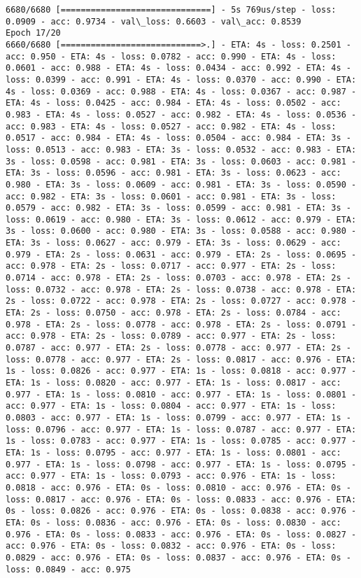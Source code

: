 \documentclass[11pt]{article}
\begin{document}
\begin{Verbatim}[commandchars=\\\{\}]
6680/6680 [==============================] - 5s 769us/step - loss: 0.0909 - acc: 0.9734 - val\_loss: 0.6603 - val\_acc: 0.8539
Epoch 17/20
6660/6680 [============================>.] - ETA: 4s - loss: 0.2501 - acc: 0.950 - ETA: 4s - loss: 0.0782 - acc: 0.990 - ETA: 4s - loss: 0.0601 - acc: 0.988 - ETA: 4s - loss: 0.0434 - acc: 0.992 - ETA: 4s - loss: 0.0399 - acc: 0.991 - ETA: 4s - loss: 0.0370 - acc: 0.990 - ETA: 4s - loss: 0.0369 - acc: 0.988 - ETA: 4s - loss: 0.0367 - acc: 0.987 - ETA: 4s - loss: 0.0425 - acc: 0.984 - ETA: 4s - loss: 0.0502 - acc: 0.983 - ETA: 4s - loss: 0.0527 - acc: 0.982 - ETA: 4s - loss: 0.0536 - acc: 0.983 - ETA: 4s - loss: 0.0527 - acc: 0.982 - ETA: 4s - loss: 0.0517 - acc: 0.984 - ETA: 4s - loss: 0.0504 - acc: 0.984 - ETA: 3s - loss: 0.0513 - acc: 0.983 - ETA: 3s - loss: 0.0532 - acc: 0.983 - ETA: 3s - loss: 0.0598 - acc: 0.981 - ETA: 3s - loss: 0.0603 - acc: 0.981 - ETA: 3s - loss: 0.0596 - acc: 0.981 - ETA: 3s - loss: 0.0623 - acc: 0.980 - ETA: 3s - loss: 0.0609 - acc: 0.981 - ETA: 3s - loss: 0.0590 - acc: 0.982 - ETA: 3s - loss: 0.0601 - acc: 0.981 - ETA: 3s - loss: 0.0579 - acc: 0.982 - ETA: 3s - loss: 0.0599 - acc: 0.981 - ETA: 3s - loss: 0.0619 - acc: 0.980 - ETA: 3s - loss: 0.0612 - acc: 0.979 - ETA: 3s - loss: 0.0600 - acc: 0.980 - ETA: 3s - loss: 0.0588 - acc: 0.980 - ETA: 3s - loss: 0.0627 - acc: 0.979 - ETA: 3s - loss: 0.0629 - acc: 0.979 - ETA: 2s - loss: 0.0631 - acc: 0.979 - ETA: 2s - loss: 0.0695 - acc: 0.978 - ETA: 2s - loss: 0.0717 - acc: 0.977 - ETA: 2s - loss: 0.0714 - acc: 0.978 - ETA: 2s - loss: 0.0703 - acc: 0.978 - ETA: 2s - loss: 0.0732 - acc: 0.978 - ETA: 2s - loss: 0.0738 - acc: 0.978 - ETA: 2s - loss: 0.0722 - acc: 0.978 - ETA: 2s - loss: 0.0727 - acc: 0.978 - ETA: 2s - loss: 0.0750 - acc: 0.978 - ETA: 2s - loss: 0.0784 - acc: 0.978 - ETA: 2s - loss: 0.0778 - acc: 0.978 - ETA: 2s - loss: 0.0791 - acc: 0.978 - ETA: 2s - loss: 0.0789 - acc: 0.977 - ETA: 2s - loss: 0.0787 - acc: 0.977 - ETA: 2s - loss: 0.0778 - acc: 0.977 - ETA: 2s - loss: 0.0778 - acc: 0.977 - ETA: 2s - loss: 0.0817 - acc: 0.976 - ETA: 1s - loss: 0.0826 - acc: 0.977 - ETA: 1s - loss: 0.0818 - acc: 0.977 - ETA: 1s - loss: 0.0820 - acc: 0.977 - ETA: 1s - loss: 0.0817 - acc: 0.977 - ETA: 1s - loss: 0.0810 - acc: 0.977 - ETA: 1s - loss: 0.0801 - acc: 0.977 - ETA: 1s - loss: 0.0804 - acc: 0.977 - ETA: 1s - loss: 0.0803 - acc: 0.977 - ETA: 1s - loss: 0.0799 - acc: 0.977 - ETA: 1s - loss: 0.0796 - acc: 0.977 - ETA: 1s - loss: 0.0787 - acc: 0.977 - ETA: 1s - loss: 0.0783 - acc: 0.977 - ETA: 1s - loss: 0.0785 - acc: 0.977 - ETA: 1s - loss: 0.0795 - acc: 0.977 - ETA: 1s - loss: 0.0801 - acc: 0.977 - ETA: 1s - loss: 0.0798 - acc: 0.977 - ETA: 1s - loss: 0.0795 - acc: 0.977 - ETA: 1s - loss: 0.0793 - acc: 0.976 - ETA: 1s - loss: 0.0818 - acc: 0.976 - ETA: 0s - loss: 0.0810 - acc: 0.976 - ETA: 0s - loss: 0.0817 - acc: 0.976 - ETA: 0s - loss: 0.0833 - acc: 0.976 - ETA: 0s - loss: 0.0826 - acc: 0.976 - ETA: 0s - loss: 0.0838 - acc: 0.976 - ETA: 0s - loss: 0.0836 - acc: 0.976 - ETA: 0s - loss: 0.0830 - acc: 0.976 - ETA: 0s - loss: 0.0833 - acc: 0.976 - ETA: 0s - loss: 0.0827 - acc: 0.976 - ETA: 0s - loss: 0.0832 - acc: 0.976 - ETA: 0s - loss: 0.0829 - acc: 0.976 - ETA: 0s - loss: 0.0837 - acc: 0.976 - ETA: 0s - loss: 0.0849 - acc: 0.975 
\end{Verbatim}
\end{document}
